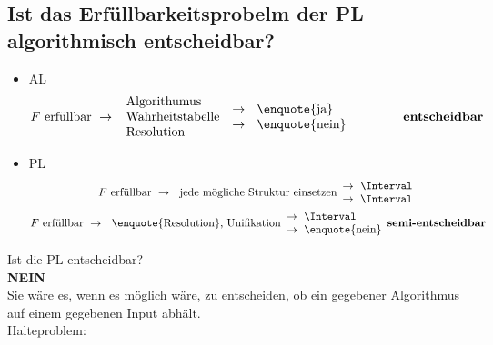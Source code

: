 \subsection{Ist das Erfüllbarkeitsprobelm der PL algorithmisch entscheidbar?}
\begin{itemize}
	\item AL \\
		\[
			F \text{ erfüllbar } \rightarrow \begin{array}{l}
				\text{Algorithumus}		\\
				\text{Wahrheitstabelle}	\\
				\text{Resolution}			
			\end{array} \begin{array}{l}
				\rightarrow \text{ \enquote{ja}}		\\
				\rightarrow \text{ \enquote{nein}}	
			\end{array} \qquad \qquad \textbf{entscheidbar}
		\]
	\item PL \\
	\begin{gather*}
		F \text{ erfüllbar } \rightarrow \text{ jede mögliche Struktur einsetzen} \begin{array}{l}
			\rightarrow \text{\Interval} \\
			\rightarrow \text{\Interval}
		\end{array} \\
		F \text{ erfüllbar } \rightarrow \text{ \enquote{Resolution}, Unifikation} \begin{array}{l}
			\rightarrow \text{\Interval} \\
			\rightarrow \text{\enquote{nein}}
		\end{array} \textbf{semi-entscheidbar}
	\end{gather*}
\end{itemize}
Ist die PL entscheidbar? \\
\textbf{NEIN}\\
Sie wäre es, wenn es möglich wäre, zu entscheiden, ob ein gegebener Algorithmus auf einem gegebenen Input abhält.\\
Halteproblem:
